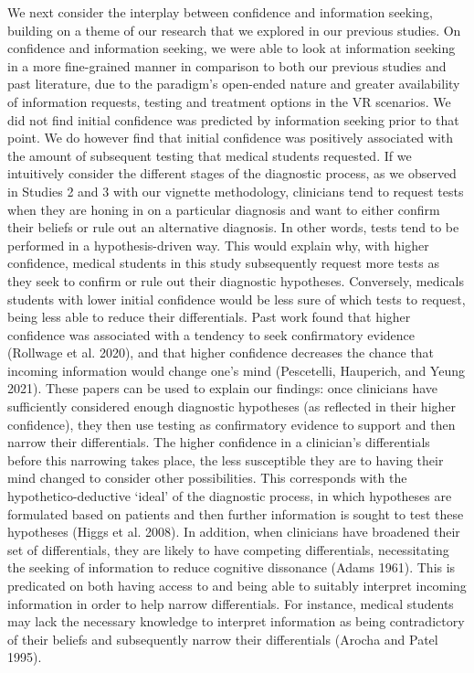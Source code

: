 \documentclass[a4paper, nobind]{templates/ociamthesis}
\begin{document}
We next consider the interplay between confidence and information seeking, building on a theme of our research that we explored in our previous studies. On confidence and information seeking, we were able to look at information seeking in a more fine-grained manner in comparison to both our previous studies and past literature, due to the paradigm's open-ended nature and greater availability of information requests, testing and treatment options in the VR scenarios. We did not find initial confidence was predicted by information seeking prior to that point. We do however find that initial confidence was positively associated with the amount of subsequent testing that medical students requested. If we intuitively consider the different stages of the diagnostic process, as we observed in Studies 2 and 3 with our vignette methodology, clinicians tend to request tests when they are honing in on a particular diagnosis and want to either confirm their beliefs or rule out an alternative diagnosis. In other words, tests tend to be performed in a hypothesis-driven way. This would explain why, with higher confidence, medical students in this study subsequently request more tests as they seek to confirm or rule out their diagnostic hypotheses. Conversely, medicals students with lower initial confidence would be less sure of which tests to request, being less able to reduce their differentials. Past work found that higher confidence was associated with a tendency to seek confirmatory evidence (Rollwage et al. 2020), and that higher confidence decreases the chance that incoming information would change one's mind (Pescetelli, Hauperich, and Yeung 2021). These papers can be used to explain our findings: once clinicians have sufficiently considered enough diagnostic hypotheses (as reflected in their higher confidence), they then use testing as confirmatory evidence to support and then narrow their differentials. The higher confidence in a clinician's differentials before this narrowing takes place, the less susceptible they are to having their mind changed to consider other possibilities. This corresponds with the hypothetico-deductive `ideal' of the diagnostic process, in which hypotheses are formulated based on patients and then further information is sought to test these hypotheses (Higgs et al. 2008). In addition, when clinicians have broadened their set of differentials, they are likely to have competing differentials, necessitating the seeking of information to reduce cognitive dissonance (Adams 1961). This is predicated on both having access to and being able to suitably interpret incoming information in order to help narrow differentials. For instance, medical students may lack the necessary knowledge to interpret information as being contradictory of their beliefs and subsequently narrow their differentials (Arocha and Patel 1995).
\end{document}
